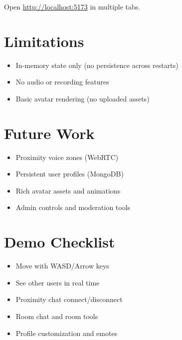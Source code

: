 \documentclass[11pt]{article}
\begin{document}
Open \url{http://localhost:5173} in multiple tabs.

\section{Limitations}
\begin{itemize}[leftmargin=*]
  \item In-memory state only (no persistence across restarts)
  \item No audio or recording features
  \item Basic avatar rendering (no uploaded assets)
\end{itemize}

\section{Future Work}
\begin{itemize}[leftmargin=*]
  \item Proximity voice zones (WebRTC)
  \item Persistent user profiles (MongoDB)
  \item Rich avatar assets and animations
  \item Admin controls and moderation tools
\end{itemize}

\section{Demo Checklist}
\begin{itemize}[leftmargin=*]
  \item Move with WASD/Arrow keys
  \item See other users in real time
  \item Proximity chat connect/disconnect
  \item Room chat and room tools
  \item Profile customization and emotes
\end{itemize}
\end{document}
